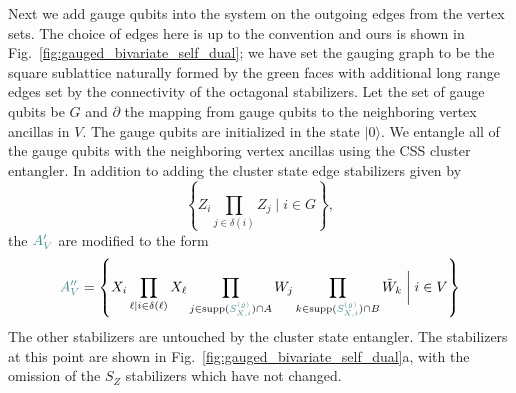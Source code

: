 \documentclass[11pt]{article}
\begin{document}
Next we add gauge qubits into the system on the outgoing edges from the vertex sets.  The choice of edges here is up to the convention and ours is shown in Fig.~\ref{fig:gauged_bivariate_self_dual}; we have set the gauging graph to be the square sublattice naturally formed by the green faces with additional long range edges set by the connectivity of the octagonal stabilizers. Let the set of gauge qubits be $G$ and $\partial$ the mapping from gauge qubits to the neighboring vertex ancillas in $V$. The gauge qubits are initialized in the state $|0\rangle$. We entangle all of the gauge qubits with the neighboring vertex ancillas using the CSS cluster entangler. In addition to adding the cluster state edge stabilizers given by 
\begin{equation}
    \left \{Z_i \prod_{j\in \delta(i)} Z_{j}\mid i \in G \right \},
\end{equation}
the $\green{A_V'}$ are modified to the form 
\begin{equation}
    \green{A_V''} = \left \{X_i \prod_{\ell \mid i \in \delta(\ell)} X_{\ell} \prod_{j \in \mathrm{supp}(\green{S^{(g)}_{X,i}}) \cap A} W_{j}  \prod_{k \in \mathrm{supp}(\green{S^{(g)}_{X,i}}) \cap B} \tilde{W}_{k} \mathrel{\bigg|} i \in V \right \}
\end{equation}
The other stabilizers are untouched by the cluster state entangler. The stabilizers at this point are shown in Fig.~\ref{fig:gauged_bivariate_self_dual}a, with the omission of the $S_Z$ stabilizers which have not changed.   
\end{document}
